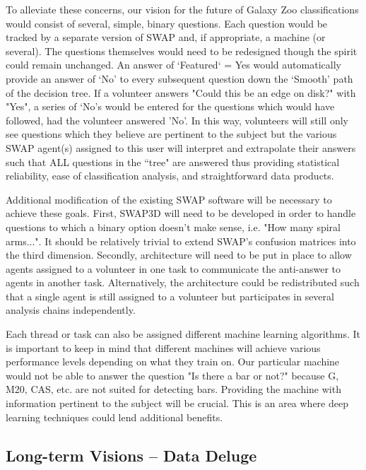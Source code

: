 \documentclass[twocolumn]{aastex6}
\begin{document}
To alleviate these concerns, our vision for the future of Galaxy Zoo classifications
would consist of several, simple, binary questions. Each question would be tracked by a 
separate version of SWAP and, if appropriate, a machine (or several). The questions
themselves would need to be redesigned though the spirit could remain unchanged. 
An answer of `Featured` = Yes would automatically provide an answer of  `No' to every 
subsequent question down the `Smooth' path of the decision tree. 
If a volunteer answers "Could this be an edge on disk?" with "Yes", a series of `No's 
would be entered for the questions which would have followed, had the volunteer answered 'No'.
In this way, volunteers will still only see questions which they believe are pertinent to the 
subject but the various SWAP agent(s) assigned to this user will interpret and 
extrapolate their answers such that ALL questions in the ``tree" are answered thus
providing statistical reliability, ease of classification analysis, and straightforward 
data products.  

Additional modification of the existing SWAP software will be necessary to achieve
these goals. First, SWAP3D will need to be developed in order to handle questions to 
which a binary option doesn't make sense, i.e. "How many spiral arms...". It should be 
relatively trivial to extend SWAP's confusion matrices into the third dimension. 
Secondly, architecture will need to be put in place to  allow agents assigned to a 
volunteer in one task to communicate the anti-answer to agents in another task. 
Alternatively, the architecture could be redistributed such that a single agent is
still assigned to a volunteer but participates in several analysis chains independently. 

Each thread or task can also be assigned different machine learning algorithms. 
It is important to keep in mind that different machines will achieve various 
performance levels depending on what they train on. Our particular machine would
not be able to answer the question "Is there a bar or not?" because G, M20, CAS, etc.
are not suited for detecting bars. Providing the machine with information 
pertinent to the subject will be crucial. This is an area where deep learning 
techniques could lend additional benefits. 

\subsection{Long-term Visions -- Data Deluge}
\end{document}
